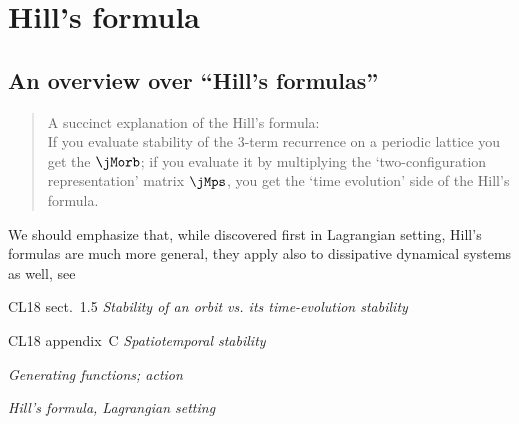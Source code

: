 
    \chapter{Hill's formula}
    \label{c-Hill}  %
\renewcommand{\shift}{\ensuremath{\ell}}

\section{An overview over ``Hill's formulas''}
\label{sect:Hill}
\renewcommand{\shift}{\ensuremath{d}}

\begin{quote}
A succinct  explanation of the Hill's formula:\\
If you evaluate stability of the 3-term recurrence  on
a periodic lattice you get the {\jacobianOrb} $\jMorb$;
if you evaluate it by multiplying the `two-configuration representation'
matrix $\jMps$, you get the `time evolution' side of the Hill's formula.
\end{quote}

We should emphasize that, while discovered first in Lagrangian setting,
Hill's formulas are much more general, they
apply also to dissipative dynamical systems as well, see

CL18 
{sect.~1.5} {\em  Stability of an orbit vs.  its time-evolution stability}

CL18 
{appendix~C} {\em Spatiotemporal stability}


 {\em Generating functions; action}


 {\em Hill's formula, Lagrangian setting}


